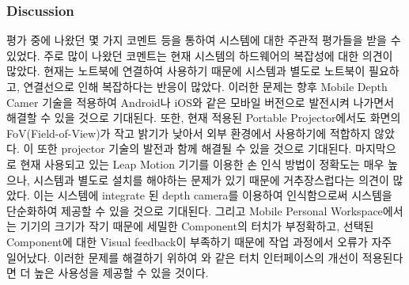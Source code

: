 \subsubsection{Discussion}
평가 중에 나왔던 몇 가지 코멘트 등을 통하여 시스템에 대한 주관적 평가들을 받을 수 있었다. 주로 많이 나왔던 코멘트는 현재 시스템의 하드웨어의 복잡성에 대한 의견이 많았다. 현재는 노트북에 연결하여 사용하기 때문에 시스템과 별도로 노트북이 필요하고, 연결선으로 인해 복잡하다는 반응이 많았다. 이러한 문제는 향후 Mobile Depth Camer 기술을 적용하여 Android나 iOS와 같은 모바일 버전으로 발전시켜 나가면서 해결할 수 있을 것으로 기대된다. 또한, 현재 적용된 Portable Projector에서도 화면의 FoV(Field-of-View)가 작고 밝기가 낮아서 외부 환경에서 사용하기에 적합하지 않았다. 이 또한 projector 기술의 발전과 함께 해결될 수 있을 것으로 기대된다. 마지막으로 현재 사용되고 있는 Leap Motion 기기를 이용한 손 인식 방법이 정확도는 매우 높으나, 시스템과 별도로 설치를 해야하는 문제가 있기 때문에 거추장스럽다는 의견이 많았다. 이는 시스템에 integrate 된 depth camera를 이용하여 인식함으로써 시스템을 단순화하여 제공할 수 있을 것으로 기대된다. 
그리고 Mobile Personal Workspace에서는 기기의 크기가 작기 때문에 세밀한 Component의 터치가 부정확하고, 선택된 Component에 대한 Visual feedback이 부족하기 때문에 작업 과정에서 오류가 자주 일어났다. 이러한 문제를 해결하기 위하여 \cite{vogel_shift:_2007}와 같은 터치 인터페이스의 개선이 적용된다면 더 높은 사용성을 제공할 수 있을 것이다.

